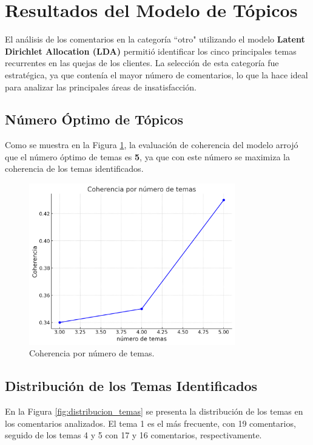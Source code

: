 \documentclass{matematicasud}
\begin{document}
\newpage
\section{Resultados del Modelo de Tópicos}

El análisis de los comentarios en la categoría ``otro" utilizando el modelo \textbf{Latent Dirichlet Allocation (LDA)} permitió identificar los cinco principales temas recurrentes en las quejas de los clientes. La selección de esta categoría fue estratégica, ya que contenía el mayor número de comentarios, lo que la hace ideal para analizar las principales áreas de insatisfacción.

\subsection{Número Óptimo de Tópicos}

Como se muestra en la Figura \ref{fig:coherencia_temas}, la evaluación de coherencia del modelo arrojó que el número óptimo de temas es \textbf{5}, ya que con este número se maximiza la coherencia de los temas identificados.

\begin{figure}[H]
    \centering
    \includegraphics[width=0.8\textwidth]{imagec.png} 
    \caption{Coherencia por número de temas.}
    \label{fig:coherencia_temas}
\end{figure}

\subsection{Distribución de los Temas Identificados}

En la Figura \ref{fig:distribucion_temas} se presenta la distribución de los temas en los comentarios analizados. El tema 1 es el más frecuente, con 19 comentarios, seguido de los temas 4 y 5 con 17 y 16 comentarios, respectivamente. 
\end{document}

